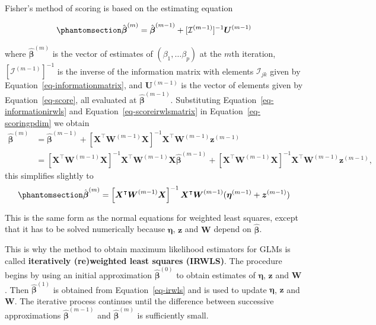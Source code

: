 \documentclass[
  a4paper,
  DIV=11,
  numbers=noendperiod]{scrreprt}
\newcommand{\term}[1]{\textbf{#1}}
\newenvironment{fbxSimple}[3]{\begin{tcolorbox}[enhanced, breakable,%
attach boxed title to top*={xshift=1.4pt},
boxed title style={boxrule=0.0mm, fuzzy shadow={1pt}{-1pt}{0mm}{0.1mm}{gray}, arc=.3em, rounded corners=east, sharp corners=west}, colframe=#1-color2, colbacktitle=#1-color1, colback = white, coltitle=black,  titlerule=0mm, toprule=0pt, bottomrule=.7pt, leftrule=.3em, rightrule=.7pt, outer arc=.3em,  	left=.5em, right=.5em, bottomtitle=1mm, toptitle=1mm,title=\textbf{#2}\hspace{0.5em}{#3}]}
{\end{tcolorbox}}
\begin{document}
\begin{fbxSimple}{Supplement}{Supplement 1}{}
Fisher's method of scoring is based on the estimating equation

\begin{equation}\phantomsection\label{eq-scoringpdim}{
\hat{\boldsymbol{\beta}}^{(m)} = \hat{\boldsymbol{\beta}}^{(m-1)} +[\mathcal{\mathcal{I}}^{(m-1)}]^{-1} \boldsymbol{U}^{(m-1)}
}\end{equation}

where \(\hat{\boldsymbol{\beta}}^{(m)}\) is the vector of estimates of
\((\beta_1,\dots \beta_p)\) at the \(m\)th iteration,
\([\mathcal{\mathcal{I}}^{(m-1)}]^{-1}\) is the inverse of the
information matrix with elements \(\mathcal{\mathcal{I}}_{jk}\) given by
Equation~\ref{eq-informationmatrix}, and \(\boldsymbol{U}^{(m-1)}\) is
the vector of elements given by Equation~\ref{eq-score}, all evaluated
at \(\hat{\boldsymbol{\beta}}^{(m-1)}\). Substituting
Equation~\ref{eq-informationirwls} and
Equation~\ref{eq-scoreirwlsmatrix} in Equation~\ref{eq-scoringpdim} we
obtain \[
\begin{aligned}
\hat{\boldsymbol{\beta}}^{(m)}&=   \hat{\boldsymbol{\beta}}^{(m-1)}+\left[\boldsymbol{X}^\intercal \boldsymbol{W}^{(m-1)} \boldsymbol{X}\right]^{-1}  \boldsymbol{X}^\intercal \boldsymbol{W}^{(m-1)} \boldsymbol{z}^{(m-1)}\\
  &=  \left[\boldsymbol{X}^\intercal \boldsymbol{W}^{(m-1)} \boldsymbol{X}\right]^{-1}  \boldsymbol{X}^\intercal \boldsymbol{W}^{(m-1)}\boldsymbol{X} \hat{\boldsymbol{\beta}}^{(m-1)}+\left[\boldsymbol{X}^\intercal \boldsymbol{W}^{(m-1)} \boldsymbol{X}\right]^{-1}  \boldsymbol{X}^\intercal \boldsymbol{W}^{(m-1)} \boldsymbol{z}^{(m-1)},
\end{aligned}
\] this simplifies slightly to
\begin{equation}\phantomsection\label{eq-irwls}{
\hat{\boldsymbol{\beta}}^{(m)} =\left[\boldsymbol{X}^\intercal \boldsymbol{W}^{(m-1)} \boldsymbol{X}\right]^{-1}  \boldsymbol{X}^\intercal \boldsymbol{W}^{(m-1)} (\boldsymbol{\eta}^{(m-1)}+\boldsymbol{z}^{(m-1)})
}\end{equation}

This is the same form as the normal equations for weighted least
squares, except that it has to be solved numerically because
\(\boldsymbol{\eta}\), \(\boldsymbol{z}\) and \(\boldsymbol{W}\) depend
on \(\hat{\boldsymbol{\beta}}\).

This is why the method to obtain maximum likelihood estimators for GLMs
is called \term{iteratively (re)weighted least squares (IRWLS)}. The
procedure begins by using an initial approximation
\(\hat{\boldsymbol{\beta}}^{(0)}\) to obtain estimates of
\(\boldsymbol{\eta}\), \(\boldsymbol{z}\) and \(\boldsymbol{W}\). Then
\(\hat{\boldsymbol{\beta}}^{(1)}\) is obtained from
Equation~\ref{eq-irwls} and is used to update \(\boldsymbol{\eta}\),
\(\boldsymbol{z}\) and \(\boldsymbol{W}\). The iterative process
continues until the difference between successive approximations
\(\hat{\boldsymbol{\beta}}^{(m-1)}\) and
\(\hat{\boldsymbol{\beta}}^{(m)}\) is sufficiently small.

\end{fbxSimple}
\end{document}
